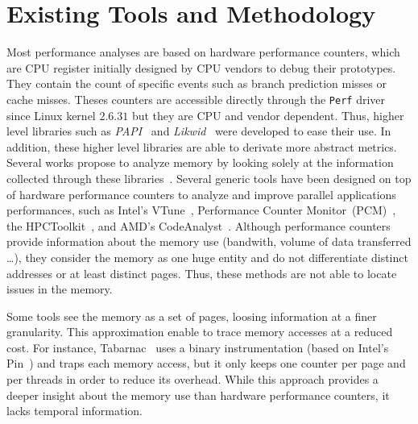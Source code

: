\section{Existing Tools and Methodology}
\label{sec:mem-tools}

Most performance analyses are based on hardware performance counters, which are CPU
register initially designed by CPU vendors to debug their prototypes. They contain
the count of specific events such as branch prediction misses or cache misses.
Theses counters are accessible directly  through the \texttt{Perf} driver
since Linux kernel $2.6.31$ but they are CPU and vendor dependent. Thus, higher
level libraries such as \emph{PAPI}~\cite{Weaver13PAPI} and
\emph{Likwid}~\cite{Treibig10LIKWID} were developed to ease their use.
In addition, these higher level libraries are able to derivate more abstract metrics. Several works propose to analyze memory 
by looking solely at the information collected through these
libraries~\cite{Majo13(Mis)understanding,
Jiang14Understanding,Bosch00Rivet,Weyers14Visualization,Tao01Visualizing,DeRose01Hardware}.
%
Several generic tools have been designed on top of hardware performance counters
to analyze and improve parallel applications performances, such as Intel's
VTune~\cite{Reinders05VTune}, Performance Counter
Monitor~(PCM)~\cite{Intel2012b}, the HPCToolkit~\cite{Adhianto10HPCTOOLKIT},
and AMD's CodeAnalyst~\cite{Drongowski2008}.
%
Although performance counters provide information about the memory use
(bandwith, volume of data transferred \ldots),  they consider the memory as
one huge entity and do not differentiate distinct addresses or at least
distinct pages. Thus, these methods are not able to locate issues in the memory.

Some tools see the memory as a set of pages, loosing information at a finer
granularity. This approximation enable to trace memory accesses at a reduced
cost. For instance, \gls{Tabarnac}~\cite{Beniamine15TABARNAC} uses a binary
instrumentation (based on Intel's Pin~\cite{Luk05Pin}) and traps each
memory access, but it only keeps one counter per page and per threads in order to
reduce its overhead. While this approach provides a deeper insight about the
memory use than hardware performance counters, it lacks temporal information.

